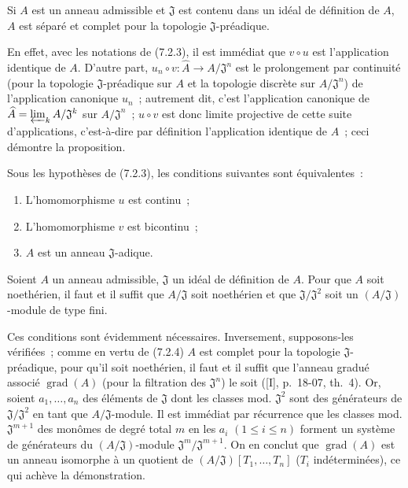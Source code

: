 \begin{proposition}[7.2.4]
\label{0.7.2.4-fr}
Si $A$ est un anneau admissible et $\mathfrak J$ est contenu dans un idéal de
définition de $A$, $A$ est séparé et complet pour la topologie
$\mathfrak J$-préadique.
\end{proposition}

En effet, avec les notations de (7.2.3), il est immédiat que $v\circ u$ est
l'application identique de $A$. D'autre part,
$u_n\circ v:\widehat A\to A/\mathfrak J^n$ est le prolongement par continuité
(pour la topologie $\mathfrak J$-préadique sur $A$ et la topologie discrète sur
$A/\mathfrak J^n$) de l'application canonique $u_n$~; autrement dit, c'est
l'application canonique de
$\widehat A=\varprojlim_k A/\mathfrak J^k$ sur $A/\mathfrak J^n$~;
$u\circ v$ est donc limite projective de cette suite d'applications,
c'est-à-dire par définition l'application identique de $\widehat A$~; ceci
démontre la proposition.

\begin{corollary}[7.2.5]
\label{0.7.2.5-fr}
Sous les hypothèses de (7.2.3), les conditions suivantes sont équivalentes~:
\begin{enumerate}
  \item[$a)$] L'homomorphisme $u$ est continu~;


  \item[$b)$] L'homomorphisme $v$ est bicontinu~;
  \item[$c)$] $A$ est un anneau $\mathfrak J$-adique.
\end{enumerate}
\end{corollary}

\begin{corollary}[7.2.6]
\label{0.7.2.6-fr}
Soient $A$ un anneau admissible, $\mathfrak J$ un idéal de définition de $A$.
Pour que $A$ soit noethérien, il faut et il suffit que $A/\mathfrak J$ soit
noethérien et que $\mathfrak J/\mathfrak J^2$ soit un
$(A/\mathfrak J)$-module de type fini.
\end{corollary}

Ces conditions sont évidemment nécessaires. Inversement, supposons-les
vérifiées~; comme en vertu de (7.2.4) $A$ est complet pour la topologie
$\mathfrak J$-préadique, pour qu'il soit noethérien, il faut et il suffit que
l'anneau gradué associé $\operatorname{grad}(A)$ (pour la filtration des
$\mathfrak J^n$) le soit ([I], p.~18-07, th.~4). Or, soient
$a_1,\ldots,a_n$ des éléments de $\mathfrak J$ dont les classes mod.
$\mathfrak J^2$ sont des générateurs de $\mathfrak J/\mathfrak J^2$ en tant
que $A/\mathfrak J$-module. Il est immédiat par récurrence que les classes mod.
$\mathfrak J^{m+1}$ des monômes de degré total $m$ en les $a_i$
$(1\leq i\leq n)$ forment un système de générateurs du
$(A/\mathfrak J)$-module $\mathfrak J^m/\mathfrak J^{m+1}$. On en conclut que
$\operatorname{grad}(A)$ est un anneau isomorphe à un quotient de
$(A/\mathfrak J)[T_1,\ldots,T_n]$ ($T_i$ indéterminées), ce qui achève la
démonstration.

